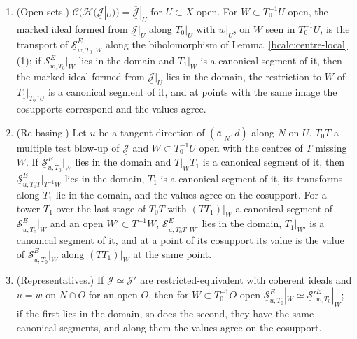 \begin{theorem}
\begin{enumerate}
\(T_0\) over \(\Phi\) with last-stage biholomorphism \(\chi_0\) and \(\psi\colon W'\to W\) is a biholomorphism of open sets of the last stages with \(\psi=\chi_0\) on \(W'\),
then \(\underline{\mathcal S}^{E}_{w\circ\Phi,T_0'}|_{W'}\), formed from \(\Phi^*\underline{\mathcal J}\), is \(\psi^*(\underline{\mathcal S}^E_{w,T_0}|_W)\). If moreover
\(\chi_0^{-1}(W)=W'\) and \(T_1'\) is isomorphic to \(T_1\) over \(\chi_0\), and \(\underline{\mathcal S}^E_{w,T_0}|_W\) lies in the domain of \(\operatorname{inv}\) with \(T_1|_W\) a
canonical segment of it, then the first marked ideal lies in the domain, \(T_1'|_{W'}\) is a canonical segment of it, and the values at corresponding points of the
cosupports agree.
\item (Open sets.) \(\mathcal C(\mathcal H(\underline{\mathcal J}|_U))=\overline{\underline{\mathcal J}}|_U\) for \(U\subset X\) open. For \(W\subset T_0^{-1}U\) open, the marked ideal formed
from \(\underline{\mathcal J}|_U\) along \(T_0|_U\) with \(w|_U\), on \(W\) seen in \(T_0^{-1}U\), is the transport of \(\underline{\mathcal S}^E_{w,T_0}|_W\) along the biholomorphism of
Lemma~\ref{bcalc:centre-local}(1); if \(\underline{\mathcal S}^E_{w,T_0}|_W\) lies in the domain and \(T_1|_W\) is a canonical segment of it, then the marked ideal formed from
\(\underline{\mathcal J}|_U\) lies in the domain, the restriction to \(W\) of \(T_1|_{T_0^{-1}U}\) is a canonical segment of it, and at points with the same image the cosupports
correspond and the values agree.
\item (Re-basing.) Let \(u\) be a tangent direction of \((\mathfrak a|_N,d)\) along \(N\) on \(U\), \(T_0T\) a multiple test blow-up of \(\overline{\underline{\mathcal J}}\) and
\(W\subset T_0^{-1}U\) open with the centres of \(T\) missing \(W\). If \(\underline{\mathcal S}^E_{u,T_0}|_W\) lies in the domain and \(T|_WT_1\) is a canonical segment of it, then
\(\underline{\mathcal S}^E_{u,T_0T}|_{T^{-1}W}\) lies in the domain, \(T_1\) is a canonical segment of it, its transforms along \(T_1\) lie in the domain, and the values agree on the
cosupport. For a tower \(T_1\) over the last stage of \(T_0T\) with \((TT_1)|_W\) a canonical segment of \(\underline{\mathcal S}^E_{u,T_0}|_W\) and an open \(W'\subset T^{-1}W\),
\(\underline{\mathcal S}^E_{u,T_0T}|_{W'}\) lies in the domain, \(T_1|_{W'}\) is a canonical segment of it, and at a point of its cosupport its value is the value of
\(\underline{\mathcal S}^E_{u,T_0}|_W\) along \((TT_1)|_W\) at the same point.
\item (Representatives.) If \(\underline{\mathcal J}\simeq\underline{\mathcal J}'\) are restricted-equivalent with coherent ideals and \(u=w\) on \(N\cap O\) for an open \(O\), then for
\(W\subset T_0^{-1}O\) open \(\underline{\mathcal S}^E_{u,T_0}|_W\simeq\underline{\mathcal S}'^E_{w,T_0}|_W\); if the first lies in the domain, so does the second, they have the same
canonical segments, and along them the values agree on the cosupport.
\end{enumerate}
\end{theorem}
